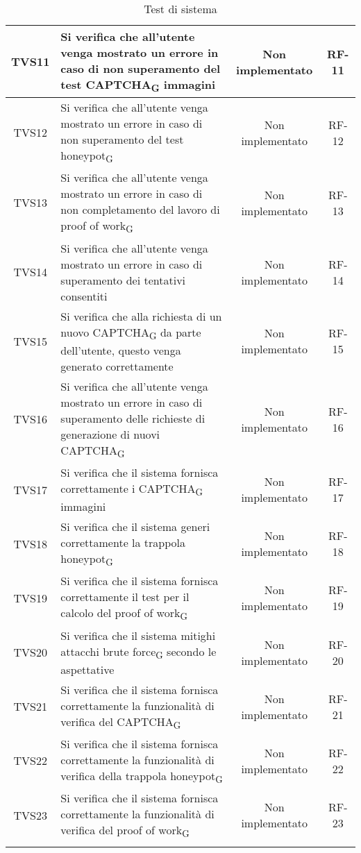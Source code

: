\begin{center}
\begin{xltabular}{\textwidth}{|c|X|c|c|}
		\hline
		TVS11 & Si verifica che all’utente venga mostrato un errore in caso di non superamento del test CAPTCHA\textsubscript{G} immagini & Non implementato & RF-11\\
		\hline
		TVS12 & Si verifica che all’utente venga mostrato un errore in caso di non superamento del test honeypot\textsubscript{G} & Non implementato & RF-12\\
		\hline
		TVS13 & Si verifica che all’utente venga mostrato un errore in caso di non completamento del lavoro di proof of work\textsubscript{G} & Non implementato & RF-13\\
		\hline
		TVS14 & Si verifica che all’utente venga mostrato un errore in caso di superamento dei tentativi consentiti & Non implementato & RF-14\\
		\hline
		TVS15 & Si verifica che alla richiesta di un nuovo CAPTCHA\textsubscript{G} da parte dell'utente, questo venga generato correttamente & Non implementato & RF-15\\
		\hline
		TVS16 & Si verifica che all’utente venga mostrato un errore in caso di superamento delle richieste di generazione di nuovi CAPTCHA\textsubscript{G} & Non implementato & RF-16\\
		\hline
		TVS17 & Si verifica che il sistema fornisca correttamente i CAPTCHA\textsubscript{G} immagini & Non implementato & RF-17\\
		\hline
		TVS18 & Si verifica che il sistema generi correttamente la trappola honeypot\textsubscript{G} & Non implementato & RF-18\\
		\hline
		TVS19 & Si verifica che il sistema fornisca correttamente il test per il calcolo del proof of work\textsubscript{G} & Non implementato & RF-19\\
		\hline
		TVS20 & Si verifica che il sistema mitighi attacchi brute force\textsubscript{G} secondo le aspettative & Non implementato & RF-20\\
		\hline
		TVS21 & Si verifica che il sistema fornisca correttamente la funzionalità di verifica del CAPTCHA\textsubscript{G} & Non implementato & RF-21\\
		\hline
		TVS22 & Si verifica che il sistema fornisca correttamente la funzionalità di verifica della trappola honeypot\textsubscript{G} & Non implementato & RF-22\\
		\hline
		TVS23 & Si verifica che il sistema fornisca correttamente la funzionalità di verifica del proof of work\textsubscript{G} & Non implementato & RF-23\\
		\hline
		\caption{Test di sistema}
	\end{xltabular}
\end{center}


